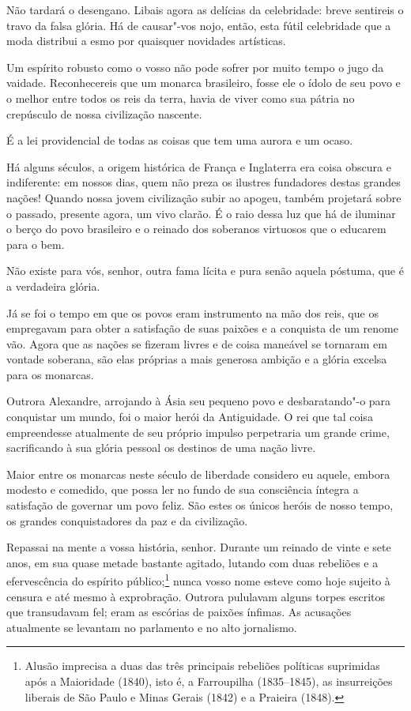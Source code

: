 Não tardará o desengano. Libais agora as delícias da celebridade: breve
sentireis o travo da falsa glória. Há de causar"-vos nojo, então, esta
fútil celebridade que a moda distribui a esmo por quaisquer novidades artísticas. 

Um espírito robusto como o vosso não pode sofrer por muito tempo o jugo
da vaidade. Reconhecereis que um monarca brasileiro, fosse ele o ídolo
de seu povo e o melhor entre todos os reis da terra, havia de viver
como sua pátria no crepúsculo de nossa civilização nascente. 

É a lei providencial de todas as coisas que tem uma aurora e um ocaso.

Há alguns séculos, a origem histórica de França e Inglaterra era coisa
obscura e indiferente: em nossos dias, quem não preza os ilustres
fundadores destas grandes nações! Quando nossa jovem civilização subir
ao apogeu, também projetará sobre o passado, presente agora, um vivo
clarão. É o raio dessa luz que há de iluminar o berço do povo
brasileiro e o reinado dos soberanos virtuosos que o educarem para o bem. \EP[2]%

\setcounter{@sectionNumCenter}{1}

\sectionitem

Não existe para vós, senhor, outra fama lícita e pura senão aquela 
póstuma, que é a verdadeira glória.

Já se foi o tempo em que os povos eram instrumento na mão dos reis, que
os empregavam para obter a satisfação de suas paixões e a conquista de
um renome vão. Agora que as nações se fizeram livres e de coisa
maneável se tornaram em vontade soberana, são elas próprias a mais
generosa ambição e a glória excelsa para os monarcas.

Outrora Alexandre, arrojando à Ásia seu pequeno povo e desbaratando"-o
para conquistar um mundo, foi o maior herói da Antiguidade. O rei que
tal coisa empreendesse atualmente de seu próprio impulso perpetraria um
grande crime, sacrificando à sua glória pessoal os destinos de uma nação livre. 

Maior entre os monarcas neste século de liberdade considero eu aquele,
embora modesto e comedido, que possa ler no fundo de sua consciência
íntegra a satisfação de governar um povo feliz. São estes os únicos
heróis de nosso tempo, os grandes conquistadores da paz e da civilização.

Repassai na mente a vossa história, senhor. Durante um reinado de vinte e
sete anos, em sua quase metade bastante agitado, lutando com duas
rebeliões e a efervescência do espírito público;\footnote{ Alusão imprecisa a duas 
das três principais rebeliões políticas suprimidas após a Maioridade (1840), isto é, a 
Farroupilha (1835--1845), as insurreições liberais de São Paulo e Minas Gerais 
(1842) e a Praieira (1848).} 
nunca vosso nome esteve como hoje sujeito à censura e até mesmo à exprobração. Outrora
pululavam alguns torpes escritos que transudavam fel; eram as escórias
de paixões ínfimas. As acusações atualmente se levantam no parlamento e
no alto jornalismo.

